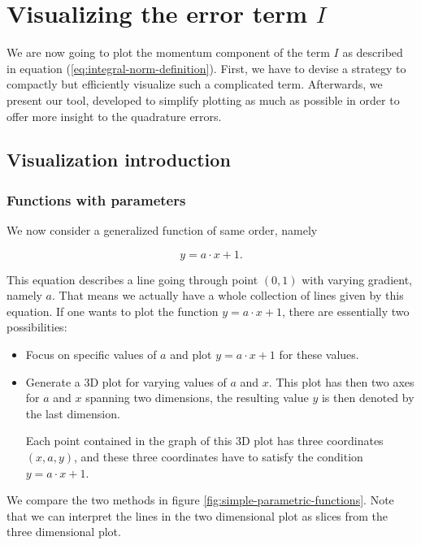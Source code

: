 \documentclass[a4paper, twoside]{article}
\begin{document}
\section{\texorpdfstring{Visualizing the error term $I$}{Visualizing the error term I}}
\label{sec:making-the-whole-thing-interactive}

We are now going to plot the momentum component of the term $I$ as described in equation (\ref{eq:integral-norm-definition}).
First, we have to devise a strategy to compactly but efficiently visualize such a complicated term.
Afterwards, we present our tool, developed to simplify plotting as much as possible in order to offer more insight to the quadrature errors.

\subsection{Visualization introduction}
\label{sec:a-word-on-visualization}

\subsubsection{Functions with parameters}

We now consider a generalized function of same order, namely

\begin{equation*}
  y = a \cdot x + 1.
\end{equation*}

This equation describes a line going through point $(0,1)$ with varying gradient, namely $a$. That means we actually have a whole collection of lines given by this equation. If one wants to plot the function $y = a \cdot x + 1$, there are essentially two possibilities:

\begin{itemize}
\item Focus on specific values of $a$ and plot $y = a \cdot x + 1$ for these values.
\item Generate a 3D plot for varying values of $a$ and $x$. This plot has then two axes for $a$ and $x$ spanning two dimensions, the resulting value $y$ is then denoted by the last dimension.

  Each point contained in the graph of this 3D plot has three coordinates $(x,a,y)$, and these three coordinates have to satisfy the condition $y = a \cdot x + 1$.
\end{itemize}

We compare the two methods in figure \ref{fig:simple-parametric-functions}. Note that we can interpret the lines in the two dimensional plot as slices from the three dimensional plot.
\end{document}
